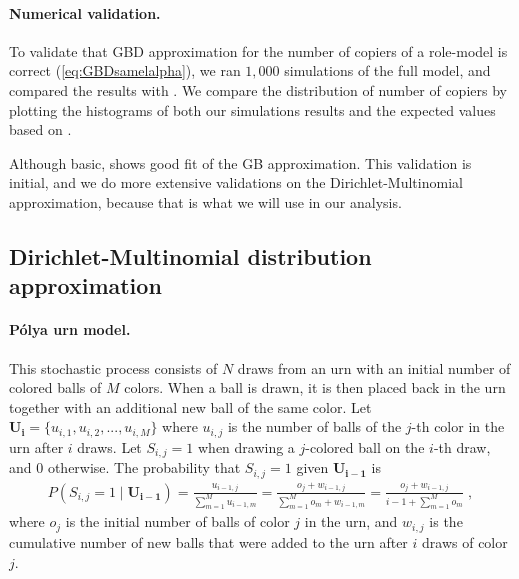\documentclass[12pt]{extarticle}
\let\vec\mathbf
\begin{document}
\paragraph{Numerical validation.}
To validate that GBD approximation for the number of copiers of a role-model is correct (\cref{eq:GBDsamelalpha}), %
we ran $1,000$ simulations of the full model, and compared the results with .
We compare the distribution of number of copiers by plotting the histograms of both our simulations results and the expected values based on .

Although basic,  shows good fit of the GB approximation.
This validation is initial, and {we do} more extensive validations on the Dirichlet-Multinomial approximation, because {that} is what we will use in our {analysis}.

\subsection*{Dirichlet-Multinomial distribution approximation}

\paragraph{P\'{o}lya urn model.}
This stochastic process consists of $N$ draws from an urn with an initial {number} of colored balls of $M$ colors. When a ball is drawn, it is then placed back in the urn together with an additional new ball of the same color.
Let $\vec{U_i} = \{u_{i,1},u_{i,2},...,u_{i,M}\}$  where $u_{i,j}$ is the number of balls of the $j$-th color in the urn after $i$ draws.
Let $S_{i,j}=1$ when drawing a $j$-colored ball on the $i$-th draw, and $0$ otherwise. The probability that $S_{i,j}=1$ given $\vec{U_{i-1}}$ is
\begin{equation}\label{eq:polya}
\begin{split}
P(S_{i,j} = 1 \mid \vec{U_{i-1}}) = 
\frac{u_{i-1,j}}{\sum\limits_{m=1}^{M} u_{i-1,m}} = 
\frac{o_j + w_{i-1,j}}{\sum\limits_{m=1}^{M} o_m + w_{i-1,m}} = 
\frac{o_j + w_{i-1,j}}{i-1 + \sum\limits_{m=1}^{M} o_m} \;,
\end{split}
\end{equation}
where $o_j$ is the initial number of balls of color $j$ in the urn, and $w_{i,j}$ is the cumulative number of new balls that were added to the urn after $i$ draws of color $j$.
\\
\end{document}
